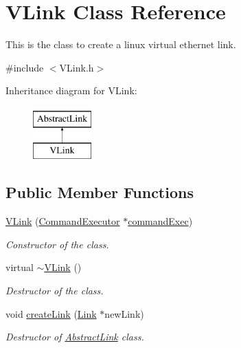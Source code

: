\hypertarget{classVLink}{\section{\-V\-Link \-Class \-Reference}
\label{classVLink}
}


\-This is the class to create a linux virtual ethernet link.  




{\ttfamily \#include $<$\-V\-Link.\-h$>$}

\-Inheritance diagram for \-V\-Link\-:\begin{figure}[H]
\begin{center}
\leavevmode
\includegraphics[height=2.000000cm]{classVLink}
\end{center}
\end{figure}
\subsection*{\-Public \-Member \-Functions}
\begin{DoxyCompactItemize}
\item 
\hyperlink{classVLink_a0657e4b997448863480c0feecd2b8b60}{\-V\-Link} (\hyperlink{classCommandExecutor}{\-Command\-Executor} $\ast$\hyperlink{classAbstractLink_a51a304e32addcc90f5c6c5cb150070e2}{command\-Exec})
\begin{DoxyCompactList}\small\item\em \-Constructor of the class. \end{DoxyCompactList}\item 
\hypertarget{classVLink_a6a886bf695e6c949a19399243186f90d}{virtual \hyperlink{classVLink_a6a886bf695e6c949a19399243186f90d}{$\sim$\-V\-Link} ()}\label{classVLink_a6a886bf695e6c949a19399243186f90d}

\begin{DoxyCompactList}\small\item\em \-Destructor of the class. \end{DoxyCompactList}\item 
\hypertarget{classVLink_afe3664a322734686f0d9ea94a755aab5}{void \hyperlink{classVLink_afe3664a322734686f0d9ea94a755aab5}{create\-Link} (\hyperlink{classLink}{\-Link} $\ast$new\-Link)}\label{classVLink_afe3664a322734686f0d9ea94a755aab5}

\begin{DoxyCompactList}\small\item\em \-Destructor of \hyperlink{classAbstractLink}{\-Abstract\-Link} class. \end{DoxyCompactList}\end{DoxyCompactItemize}
